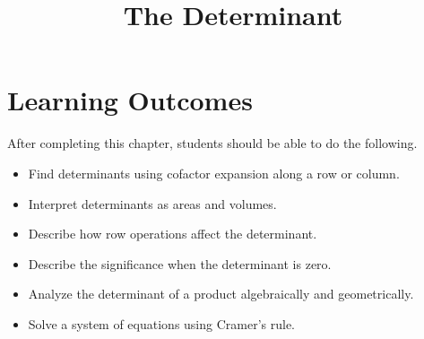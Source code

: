 \documentclass{ximera}
\title{The Determinant}
\begin{document}
\begin{abstract}

\end{abstract}
 
\maketitle
 
\section*{Learning Outcomes}
After completing this chapter, students should be able to do the following.
 
\begin{itemize}
    \item Find determinants using cofactor expansion along a row or column.
    \item Interpret determinants as areas and volumes.
    \item Describe how row operations affect the determinant. 
    \item Describe the significance when the determinant is zero. 
    \item Analyze the determinant of a product algebraically and geometrically.
    \item Solve a system of equations using Cramer's rule.
    
    
\end{itemize}

 
\end{document}
